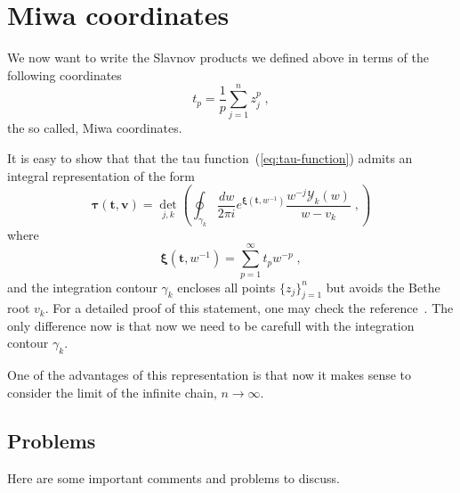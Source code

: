 \documentclass[a4paper,11pt]{amsart}
\begin{document}

\section{Miwa coordinates}

We now want to write the Slavnov products we defined above in terms of the following 
coordinates
\begin{equation}
  t_p = \frac{1}{p}\sum_{j=1}^n z_j^p\; ,
\end{equation}
the so called, Miwa coordinates.

It is easy to show that that the tau function~(\ref{eq:tau-function})
admits an integral representation of the form
\begin{equation}
  \label{eq:tau-function-miwa}
  \bm{\tau}(\bm{t}, \bm{v}) = 
    \det_{j,k}\left(
    \oint_{\gamma_k} \frac{d w}{2\pi i} e^{\bm{\xi}(\bm{t}, w^{-1})} \frac{w^{-j}\mathcal{Y}_k(w)}{w - v_k} \; ,
    \right)
\end{equation}
where 
\begin{equation}
  \bm{\xi}(\bm{t}, w^{-1}) = \sum_{p=1}^\infty t_p w^{-p}\; ,
\end{equation}
and the integration contour \(\gamma_k\) encloses all points
\(\{z_j\}_{j=1}^n\) but avoids the Bethe root \(v_k\).  For a detailed
proof of this statement, one may check the
reference~\cite{Araujo:2021ghu}.  The only difference now is that now
we need to be carefull with the integration contour \(\gamma_k\).

One of the advantages of this representation is that now it makes
sense to consider the limit of the infinite chain, \(n\to \infty\).










\subsection{Problems}
Here are some important comments and problems to discuss. 
\end{document}
